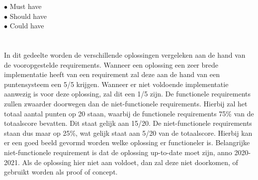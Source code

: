 \begin{description}%
    \item[$\bullet$ Must have] 
    \item[$\bullet$ Should have]
    \item[$\bullet$ Could have]
\end{description}



\section{}
\label{sec:Hoe beantwoorden de verschillende oplossingen aan de bovenstaande requirements}

In dit gedeelte worden de verschillende oplossingen vergeleken aan de hand van de vooropgestelde requirements. Wanneer een oplossing een zeer brede implementatie heeft van een requirement zal deze aan de hand van een puntensysteem een 5/5 krijgen. Wanneer er niet voldoende implementatie aanwezig is voor deze oplossing, zal dit een 1/5 zijn. De functionele requirements zullen zwaarder doorwegen dan de niet-functionele requirements. Hierbij zal het totaal aantal punten op 20 staan, waarbij de functionele requirements 75\% van de totaalscore bevatten. Dit staat gelijk aan 15/20. De niet-functionele requirements staan dus maar op 25\%, wat gelijk staat aan 5/20 van de totaalscore. Hierbij kan er een goed beeld gevormd worden welke oplossing er functioneler is. Belangrijke niet-functionele requirement is dat de oplossing up-to-date moet zijn, anno 2020-2021. Als de oplossing hier niet aan voldoet, dan zal deze niet doorkomen, of gebruikt worden als proof of concept.

